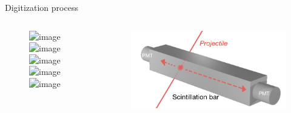 \documentclass[compress, 13pt, aspectratio=169]{beamer}
\begin{document}
\begin{frame}{Digitization process}
    \begin{columns}
        \begin{column}{0.5\textwidth}
            \begin{figure}[t]
                \includegraphics<1>[keepaspectratio, height = 0.8\textheight]{digiFlow/digiFlow.001.png}%
                \includegraphics<2>[keepaspectratio, height = 0.8\textheight]{digiFlow/digiFlow.002.png}%
                \includegraphics<3>[keepaspectratio, height = 0.8\textheight]{digiFlow/digiFlow.003.png}%
                \includegraphics<4>[keepaspectratio, height = 0.8\textheight]{digiFlow/digiFlow.005.png}%
                \includegraphics<5>[keepaspectratio, height = 0.8\textheight]{digiFlow/digiFlow.005.png}%
            \end{figure}
        \end{column}
        \begin{column}{0.5\textwidth}
            \vspace*{-0.5cm}
            \begin{figure}[t]
                \includegraphics[keepaspectratio, height = 0.3\textheight]{Bar}%
            \end{figure}
            \vspace*{-0.5cm}
            {
            \begin{figure}[t]

\end{figure}}
\end{column}
\end{columns}
\end{frame}
\end{document}
